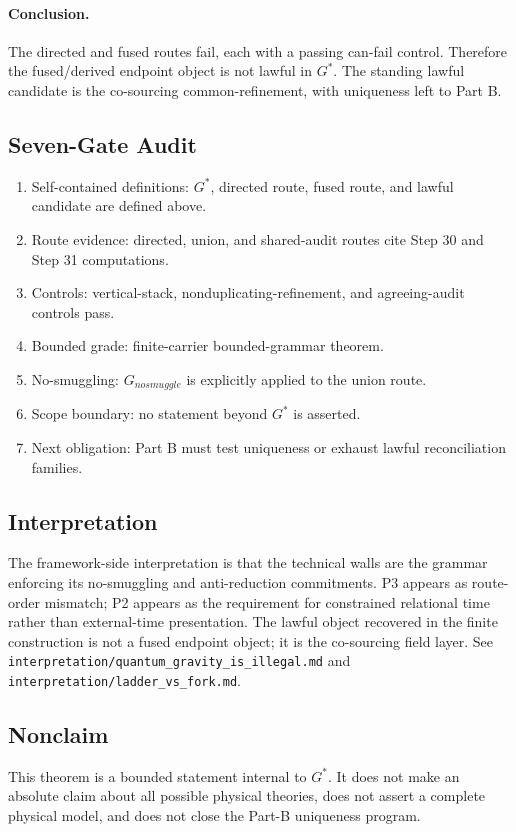 \paragraph{Conclusion.}
The directed and fused routes fail, each with a passing can-fail control.
Therefore the fused/derived endpoint object is not lawful in \(G^\ast\).  The
standing lawful candidate is the co-sourcing common-refinement, with uniqueness
left to Part B.

\subsection*{Seven-Gate Audit}

\begin{enumerate}
\item Self-contained definitions: \(G^\ast\), directed route, fused route, and
  lawful candidate are defined above.
\item Route evidence: directed, union, and shared-audit routes cite Step 30 and
  Step 31 computations.
\item Controls: vertical-stack, nonduplicating-refinement, and agreeing-audit
  controls pass.
\item Bounded grade: finite-carrier bounded-grammar theorem.
\item No-smuggling: \(G_{nosmuggle}\) is explicitly applied to the union route.
\item Scope boundary: no statement beyond \(G^\ast\) is asserted.
\item Next obligation: Part B must test uniqueness or exhaust lawful
  reconciliation families.
\end{enumerate}

\subsection*{Interpretation}

The framework-side interpretation is that the technical walls are the grammar
enforcing its no-smuggling and anti-reduction commitments.  P3 appears as
route-order mismatch; P2 appears as the requirement for constrained relational
time rather than external-time presentation.  The lawful object recovered in
the finite construction is not a fused endpoint object; it is the co-sourcing
field layer.  See
\texttt{interpretation/quantum\_gravity\_is\_illegal.md}
and
\texttt{interpretation/ladder\_vs\_fork.md}.

\subsection*{Nonclaim}

This theorem is a bounded statement internal to \(G^\ast\).  It does not make
an absolute claim about all possible physical theories, does not assert a
complete physical model, and does not close the Part-B uniqueness program.
